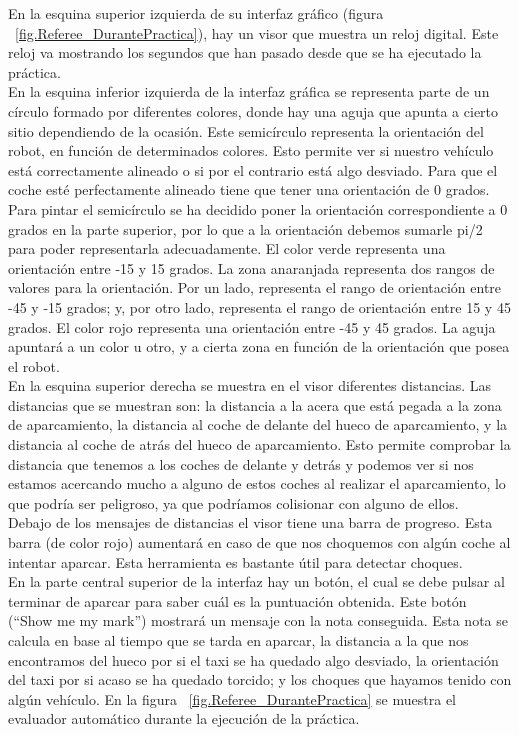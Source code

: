 En la esquina superior izquierda de su interfaz gráfico (figura ~\ref{fig.Referee_DurantePractica}), hay un visor que muestra un reloj digital. Este reloj va mostrando los segundos que han pasado desde que se ha ejecutado la práctica.\\

En la esquina inferior izquierda de la interfaz gráfica se representa parte de un círculo formado por diferentes colores, donde hay una aguja que apunta a cierto sitio dependiendo de la ocasión. Este semicírculo representa la orientación del robot, en función de determinados colores. Esto permite ver si nuestro vehículo está correctamente alineado o si por el contrario está algo desviado. Para que el coche esté perfectamente alineado tiene que tener una orientación de 0 grados. Para pintar el semicírculo se ha decidido poner la orientación correspondiente a 0 grados en la parte superior, por lo que a la orientación debemos sumarle pi/2 para poder representarla adecuadamente. El color verde representa una orientación entre -15 y 15 grados. La zona anaranjada representa dos rangos de valores para la orientación. Por un lado, representa el rango de orientación entre -45 y -15 grados; y, por otro lado, representa el rango de orientación entre 15 y 45 grados. El color rojo representa una orientación entre -45 y 45 grados. La aguja apuntará a un color u otro, y a cierta zona en función de la orientación que posea el robot.\\

En la esquina superior derecha se muestra en el visor diferentes distancias. Las distancias que se muestran son: la distancia a la acera que está pegada a la zona de aparcamiento, la distancia al coche de delante del hueco de aparcamiento, y la distancia al coche de atrás del hueco de aparcamiento. Esto permite comprobar la distancia que tenemos a los coches de delante y detrás y podemos ver si nos estamos acercando mucho a alguno de estos coches al realizar el aparcamiento, lo que podría ser peligroso, ya que podríamos colisionar con alguno de ellos.\\

Debajo de los mensajes de distancias el visor tiene una barra de progreso. Esta barra (de color rojo) aumentará en caso de que nos choquemos con algún coche al intentar aparcar. Esta herramienta es bastante útil para detectar choques. \\


En la parte central superior de la interfaz hay un botón, el cual se debe pulsar al terminar de aparcar para saber cuál es la puntuación obtenida. Este botón (``Show me my mark'') mostrará un mensaje con la nota conseguida. Esta nota se calcula en base al tiempo que se tarda en aparcar, la distancia a la que nos encontramos del hueco por si el taxi se ha quedado algo desviado, la orientación del taxi por si acaso se ha quedado torcido; y los choques que hayamos tenido con algún vehículo. En la figura ~\ref{fig.Referee_DurantePractica} se muestra el evaluador automático durante la ejecución de la práctica.

